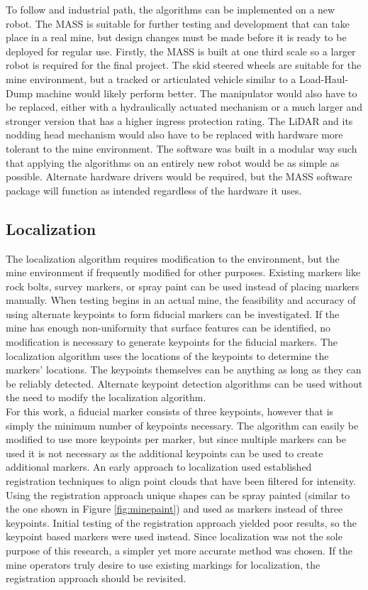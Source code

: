 To follow and industrial path, the algorithms can be implemented on a new robot. The MASS is suitable for further testing and development that can take place in a real mine, but design changes must be made before it is ready to be deployed for regular use. Firstly, the MASS is built at one third scale so a larger robot is required for the final project. The skid steered wheels are suitable for the mine environment, but a tracked or articulated vehicle similar to a Load-Haul-Dump machine would likely perform better. The manipulator would also have to be replaced, either with a hydraulically actuated mechanism or a much larger and stronger version that has a higher ingress protection rating. The LiDAR and its nodding head mechanism would also have to be replaced with hardware more tolerant to the mine environment. The software was built in a modular way such that applying the algorithms on an entirely new robot would be as simple as possible. Alternate hardware drivers would be required, but the MASS software package will function as intended regardless of the hardware it uses.\\

\subsection{Localization}

The localization algorithm requires modification to the environment, but the mine environment if frequently modified for other purposes. Existing markers like rock bolts, survey markers, or spray paint can be used instead of placing markers manually. When testing begins in an actual mine, the feasibility and accuracy of using alternate keypoints to form fiducial markers can be investigated. If the mine has enough non-uniformity that surface features can be identified, no modification is necessary to generate keypoints for the fiducial markers. The localization algorithm uses the locations of the keypoints to determine the markers' locations. The keypoints themselves can be anything as long as they can be reliably detected. Alternate keypoint detection algorithms can be used without the need to modify the localization algorithm.\\

For this work, a fiducial marker consists of three keypoints, however that is simply the minimum number of keypoints necessary. The algorithm can easily be modified to use more keypoints per marker, but since multiple markers can be used it is not necessary as the additional keypoints can be used to create additional markers. An early approach to localization used established registration techniques to align point clouds that have been filtered for intensity. Using the registration approach unique shapes can be spray painted (similar to the one shown in Figure \ref{fig:minepaint}) and used as markers instead of three keypoints. Initial testing of the registration approach yielded poor results, so the keypoint based markers were used instead. Since localization was not the sole purpose of this research, a simpler yet more accurate method was chosen. If the mine operators truly desire to use existing markings for localization, the registration approach should be revisited.\\

